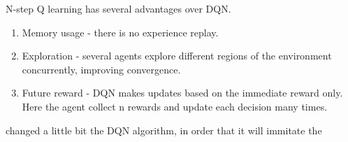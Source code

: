 \documentclass[10pt,a4paper,draft]{article}
\begin{document}
N-step Q learning has several advantages over DQN. 
\begin{enumerate}
	\item Memory usage - there is no experience replay. 
	\item Exploration - several agents explore different regions of the environment concurrently, improving convergence.
	\item Future reward - DQN makes updates based on the immediate reward only. Here the agent collect n rewards and update each decision many times. 
\end{enumerate}
\cite{dai17-tsp-s2v} changed  a little bit the DQN algorithm, in order that it will immitate the 



\end{document}

